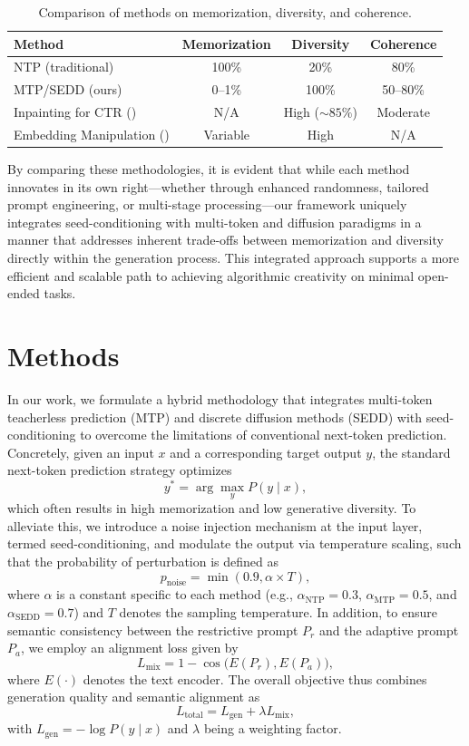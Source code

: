 \documentclass{article} %
\begin{document}
\begin{table}[h!]
\centering
\caption{Comparison of methods on memorization, diversity, and coherence.}
\label{tab:related}
\begin{tabular}{|l|c|c|c|}
\hline
\textbf{Method} & \textbf{Memorization} & \textbf{Diversity} & \textbf{Coherence} \\ \hline
NTP (traditional) & 100\% & 20\% & 80\% \\ \hline
MTP/SEDD (ours) & 0--1\% & 100\% & 50--80\% \\ \hline
Inpainting for CTR (\cite{yang2024new}) & N/A & High (\(\sim85\%\)) & Moderate \\ \hline
Embedding Manipulation (\cite{deckers2023manipulating}) & Variable & High & N/A \\ \hline
\end{tabular}
\end{table}


By comparing these methodologies, it is evident that while each method innovates in its own right—whether through enhanced randomness, tailored prompt engineering, or multi-stage processing—our framework uniquely integrates seed-conditioning with multi-token and diffusion paradigms in a manner that addresses inherent trade-offs between memorization and diversity directly within the generation process. This integrated approach supports a more efficient and scalable path to achieving algorithmic creativity on minimal open-ended tasks.

\section{Methods}
In our work, we formulate a hybrid methodology that integrates multi-token teacherless prediction (MTP) and discrete diffusion methods (SEDD) with seed-conditioning to overcome the limitations of conventional next-token prediction. Concretely, given an input \( x \) and a corresponding target output \( y \), the standard next-token prediction strategy optimizes
\[
y^* = \arg\max_{y} P(y \mid x),
\]
which often results in high memorization and low generative diversity. To alleviate this, we introduce a noise injection mechanism at the input layer, termed seed-conditioning, and modulate the output via temperature scaling, such that the probability of perturbation is defined as 
\[
p_{\text{noise}} = \min(0.9, \alpha \times T),
\]
where \( \alpha \) is a constant specific to each method (e.g., \( \alpha_{\text{NTP}}=0.3 \), \( \alpha_{\text{MTP}}=0.5 \), and \( \alpha_{\text{SEDD}}=0.7 \)) and \( T \) denotes the sampling temperature. In addition, to ensure semantic consistency between the restrictive prompt \( P_r \) and the adaptive prompt \( P_a \), we employ an alignment loss given by
\[
L_{\text{mix}} = 1 - \cos\big(E(P_r), E(P_a)\big),
\]
where \( E(\cdot) \) denotes the text encoder. The overall objective thus combines generation quality and semantic alignment as
\[
L_{\text{total}} = L_{\text{gen}} + \lambda L_{\text{mix}},
\]
with \( L_{\text{gen}} = -\log P(y\mid x) \) and \(\lambda\) being a weighting factor.
\end{document}

